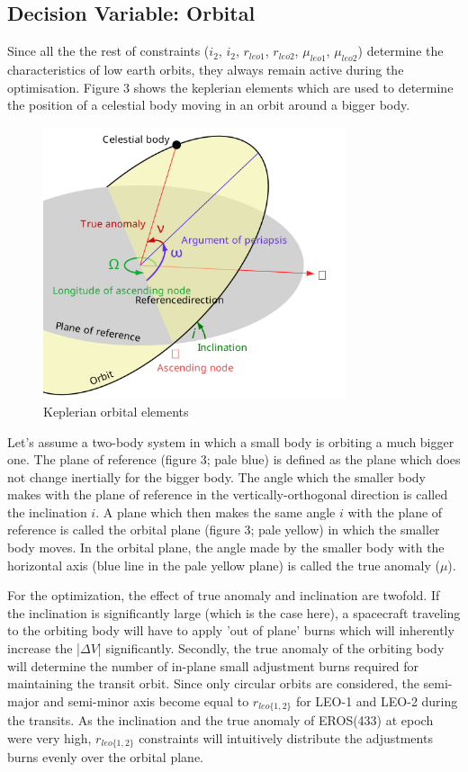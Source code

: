 \documentclass[11pt,a4paper]{article}
\begin{document}
\begin{multicols}{2}
\subsection{Decision Variable: Orbital}
Since all the the rest of constraints ($i_2$, $i_2$, $r_{leo1}$, $r_{leo2}$, $\mu_{leo1}$, $\mu_{leo2}$) determine the characteristics of low earth orbits, they always remain active during the optimisation. Figure 3 shows the keplerian elements which are used to determine the position of a celestial body moving in an orbit around a bigger body.
\begin{figure}[H]
\centering
\includegraphics[width=3.5in]{images/orbital.pdf}
\caption{Keplerian orbital elements}
\end{figure}
Let's assume a two-body system in which a small body is orbiting a much bigger one. The plane of reference (figure 3; pale blue) is defined as the plane which does not change inertially for the bigger body. The angle which the smaller body makes with the plane of reference in the vertically-orthogonal direction is called the inclination $i$. A plane which then makes the same angle $i$ with the plane of reference is called the orbital plane (figure 3; pale yellow) in which the smaller body moves. In the orbital plane, the angle made by the smaller body with the horizontal axis (blue line in the pale yellow plane) is called the true anomaly ($\mu$).

For the optimization, the effect of true anomaly and inclination are twofold. If the inclination is significantly large (which is the case here), a spacecraft traveling to the orbiting body will have to apply 'out of plane' burns which will inherently increase the |$\Delta V$| significantly. Secondly, the true anomaly of the orbiting body will determine the number of in-plane small adjustment burns required for maintaining the transit orbit. Since only circular orbits are considered, the semi-major and semi-minor axis become equal to $r_{leo\{1,2\}}$ for LEO-1 and LEO-2 during the transits. As the inclination and the true anomaly of EROS(433) at epoch were very high, $r_{leo\{1,2\}}$ constraints will intuitively distribute the adjustments burns evenly over the orbital plane. 
\end{multicols}
\end{document}
